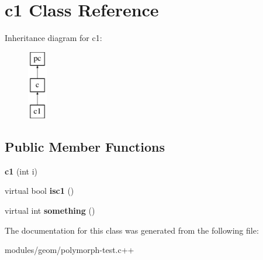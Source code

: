 \hypertarget{classc1}{\section{c1 Class Reference}
\label{classc1}
}
Inheritance diagram for c1\-:\begin{figure}[H]
\begin{center}
\leavevmode
\includegraphics[height=3.000000cm]{classc1}
\end{center}
\end{figure}
\subsection*{Public Member Functions}
\begin{DoxyCompactItemize}
\item 
\hypertarget{classc1_a16f80cd1949866503e8de3d0d5a86996}{{\bfseries c1} (int i)}\label{classc1_a16f80cd1949866503e8de3d0d5a86996}

\item 
\hypertarget{classc1_a416f2fdd0095878a1662c59b723eccdc}{virtual bool {\bfseries isc1} ()}\label{classc1_a416f2fdd0095878a1662c59b723eccdc}

\item 
\hypertarget{classc1_aaeabbd60d265afc206911deab6ba529b}{virtual int {\bfseries something} ()}\label{classc1_aaeabbd60d265afc206911deab6ba529b}

\end{DoxyCompactItemize}


The documentation for this class was generated from the following file\-:\begin{DoxyCompactItemize}
\item 
modules/geom/polymorph-\/test.\-c++\end{DoxyCompactItemize}
